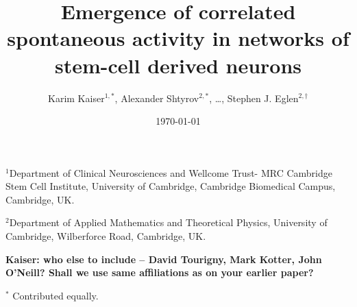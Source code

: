 \documentclass[11pt]{article}
\begin{document}
\doublespacing



\renewcommand{\um}{\,\ensuremath{\upmu \text{m}}\xspace}
\providecommand{\mm}{}
\renewcommand{\mm}{\,mm\xspace}
\newcommand{\moire}{Moir\'{e}\xspace}
\newcommand{\td}{\ensuremath{\mu_2}\xspace}
\newcommand{\dtheta}{\ensuremath{\Delta \theta}\xspace}
\newcommand{\dnn}{\ensuremath{D}\xspace}
\newcommand{\ournote}[1]{\marginpar{\textbf{#1}}}
\renewcommand{\ournote}[1]{}

\newcommand{\thref}[1]{\ref{#1}\marginpar{{\footnotesize
      {Table~\ref{#1} here}}}}
\newcommand{\fhref}[1]{\ref{#1}\marginpar{{\footnotesize
      {Fig.~\ref{#1} here}}}}

\newcommand{\ig}[1]{\centering\fbox{\texttt{[image: \#1]}}}
\renewcommand{\ig}[1]{}
\providecommand*{\ped}[1]{\ensuremath{_\mathrm{#1}}}
\newcommand{\thetitle}{Emergence of correlated spontaneous activity in
  networks of stem-cell derived neurons}
\title{\thetitle}



\author{Karim Kaiser$^{1,\ast}$, Alexander Shtyrov$^{2,\ast}$,
  \ldots,
  Stephen J. Eglen$^{2,\dagger}$}
\date{\today}
\maketitle


\noindent $^{1}$Department of Clinical Neurosciences and Wellcome
Trust- MRC Cambridge Stem Cell Institute, University of Cambridge,
Cambridge Biomedical Campus, Cambridge, UK.

\noindent $^{2}$Department of Applied Mathematics and Theoretical Physics,
University of Cambridge, Wilberforce Road, Cambridge, UK.


\textbf{Kaiser: who else to include -- David Tourigny, Mark Kotter,
  John O'Neill?  Shall we use same affiliations as on your earlier
  paper? \cite{Tourigny2019-lk}}


\vspace*{2mm}


\noindent $^\ast$ Contributed equally.
\end{document}
